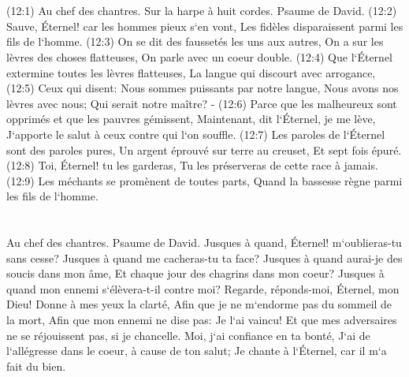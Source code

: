 \chapter{}

\verse (12:1) Au chef des chantres. Sur la harpe à huit cordes. Psaume de David. (12:2) Sauve, Éternel! car les hommes pieux s`en vont, Les fidèles disparaissent parmi les fils de l`homme. 
\verse (12:3) On se dit des faussetés les uns aux autres, On a sur les lèvres des choses flatteuses, On parle avec un coeur double. 
\verse (12:4) Que l`Éternel extermine toutes les lèvres flatteuses, La langue qui discourt avec arrogance, 
\verse (12:5) Ceux qui disent: Nous sommes puissants par notre langue, Nous avons nos lèvres avec nous; Qui serait notre maître? - 
\verse (12:6) Parce que les malheureux sont opprimés et que les pauvres gémissent, Maintenant, dit l`Éternel, je me lève, J`apporte le salut à ceux contre qui l`on souffle. 
\verse (12:7) Les paroles de l`Éternel sont des paroles pures, Un argent éprouvé sur terre au creuset, Et sept fois épuré. 
\verse (12:8) Toi, Éternel! tu les garderas, Tu les préserveras de cette race à jamais. 
\verse (12:9) Les méchants se promènent de toutes parts, Quand la bassesse règne parmi les fils de l`homme. 

\chapter{}

\verse Au chef des chantres. Psaume de David. 
\verse Jusques à quand, Éternel! m`oublieras-tu sans cesse? Jusques à quand me cacheras-tu ta face? 
\verse Jusques à quand aurai-je des soucis dans mon âme, Et chaque jour des chagrins dans mon coeur? Jusques à quand mon ennemi s`élèvera-t-il contre moi? 
\verse Regarde, réponds-moi, Éternel, mon Dieu! Donne à mes yeux la clarté, Afin que je ne m`endorme pas du sommeil de la mort, 
\verse Afin que mon ennemi ne dise pas: Je l`ai vaincu! Et que mes adversaires ne se réjouissent pas, si je chancelle. 
\verse Moi, j`ai confiance en ta bonté, J`ai de l`allégresse dans le coeur, à cause de ton salut; Je chante à l`Éternel, car il m`a fait du bien. 

\chapter{}


